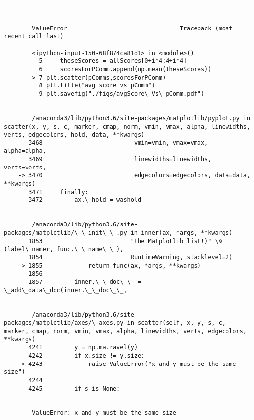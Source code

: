 \documentclass[11pt]{article}
\begin{document}
    \begin{Verbatim}[commandchars=\\\{\}]

        ---------------------------------------------------------------------------

        ValueError                                Traceback (most recent call last)

        <ipython-input-150-68f874ca81d1> in <module>()
          5     theseScores = allScores[0+i*4:4+i*4]
          6     scoresForPComm.append(np.mean(theseScores))
    ----> 7 plt.scatter(pComms,scoresForPComm)
          8 plt.title("avg score vs pComm")
          9 plt.savefig("./figs/avgScore\_Vs\_pComm.pdf")


        /anaconda3/lib/python3.6/site-packages/matplotlib/pyplot.py in scatter(x, y, s, c, marker, cmap, norm, vmin, vmax, alpha, linewidths, verts, edgecolors, hold, data, **kwargs)
       3468                          vmin=vmin, vmax=vmax, alpha=alpha,
       3469                          linewidths=linewidths, verts=verts,
    -> 3470                          edgecolors=edgecolors, data=data, **kwargs)
       3471     finally:
       3472         ax.\_hold = washold


        /anaconda3/lib/python3.6/site-packages/matplotlib/\_\_init\_\_.py in inner(ax, *args, **kwargs)
       1853                         "the Matplotlib list!)" \% (label\_namer, func.\_\_name\_\_),
       1854                         RuntimeWarning, stacklevel=2)
    -> 1855             return func(ax, *args, **kwargs)
       1856 
       1857         inner.\_\_doc\_\_ = \_add\_data\_doc(inner.\_\_doc\_\_,


        /anaconda3/lib/python3.6/site-packages/matplotlib/axes/\_axes.py in scatter(self, x, y, s, c, marker, cmap, norm, vmin, vmax, alpha, linewidths, verts, edgecolors, **kwargs)
       4241         y = np.ma.ravel(y)
       4242         if x.size != y.size:
    -> 4243             raise ValueError("x and y must be the same size")
       4244 
       4245         if s is None:


        ValueError: x and y must be the same size

    \end{Verbatim}

    \begin{center}
    \end{center}
    { \hspace*{\fill} \\}
    
\end{document}
